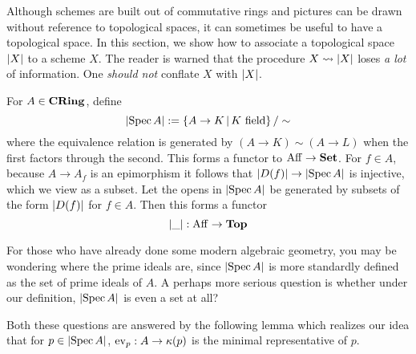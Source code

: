 \documentclass[./main.tex]{subfiles}
\begin{document}
Although schemes are built out of commutative rings
and pictures can be drawn without reference to topological spaces,
it can sometimes be useful to have a topological space.
In this section, we show how to associate a topological space $\left\vert X \right\vert$
to a scheme $X$.
The reader is warned that the procedure
$X \rightsquigarrow \left\vert X \right\vert$ loses \emph{a lot} of information.
One \emph{should not} conflate $X$ with $\left\vert X \right\vert$.

\begin{dfn}
  
  For $A \in \mathbf{CRing}$, 
  define \[
    \left\vert \operatorname{Spec} A \right\vert := \left\{A \to K \,|\, K \text{ field}\right\} / \sim
  \]
  where the equivalence relation is generated by 
  $(A \to K) \sim (A \to L)$ when the first factors through the second.
  This forms a functor to $\mathrm{Aff} \to \mathbf{Set}$.
  For $f \in A$, because $A \to A_f$ is an epimorphism
  it follows that $\left\vert D(f) \right\vert \to \left\vert \operatorname{Spec} A \right\vert$ is injective,
  which we view as a subset.
  Let the opens in $\left\vert \operatorname{Spec} A \right\vert$
  be generated by subsets of the form $\left\vert D(f) \right\vert$ for $f \in A$.
  Then this forms a functor \[
    \left\vert \_ \right\vert : \mathrm{Aff} \to \mathbf{Top}
  \]
\end{dfn}

\begin{rmk}[Worries]

  For those who have already done some modern algebraic geometry, 
  you may be wondering where the prime ideals are,
  since $\left\vert \operatorname{Spec} A \right\vert$ is more standardly defined as 
  the set of prime ideals of $A$.
  A perhaps more serious question is whether under our definition,
  $\left\vert \operatorname{Spec} A \right\vert$ is even a set at all?
  
  Both these questions are answered by the following lemma 
  which realizes our idea that for $p \in \left\vert \operatorname{Spec} A \right\vert$,
  $\operatorname{ev}_p : A \to \kappa(p)$ is the minimal representative of $p$.
  
\end{rmk}
\end{document}

